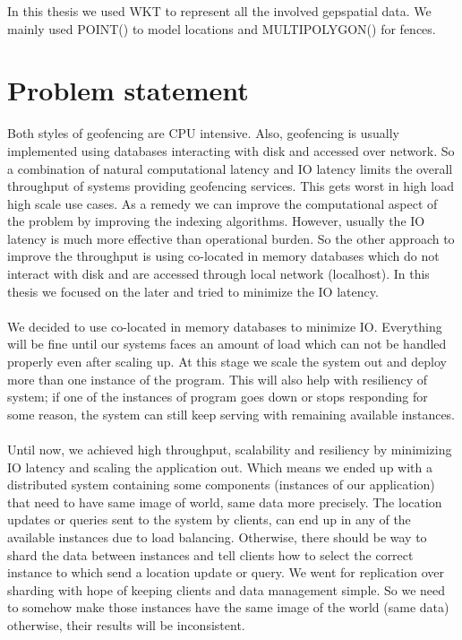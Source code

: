 \documentclass[a4]{report}
\begin{document}
        In this thesis we used WKT to represent all the involved gepspatial data.
        We mainly used POINT() to model locations and MULTIPOLYGON() for fences.

        \section{Problem statement}
        Both styles of geofencing are CPU intensive.
        Also, geofencing is usually implemented using databases interacting with disk and accessed over network.
        So a combination of natural computational latency and IO latency limits the overall throughput of systems
        providing geofencing services.
        This gets worst in high load high scale use cases.
        As a remedy we can improve the computational aspect of the problem by improving the indexing algorithms.
        However, usually the IO latency is much more effective than operational burden.
        So the other approach to improve the throughput is using co-located in memory databases  which do not interact
        with disk and are accessed through local network (localhost).
        In this thesis we focused on the later and tried to minimize the IO latency.

        \paragraph{}
        We decided to use co-located in memory databases to minimize IO.
        Everything will be fine until our systems faces an amount of load which can not be handled properly even after scaling up.
        At this stage we scale the system out and deploy more than one instance of the program.
        This will also help with resiliency of system;
        if one of the instances of program goes down or stops responding for some reason, the system can still keep
        serving with remaining available instances.

        \paragraph{}
        Until now, we achieved high throughput, scalability and resiliency by minimizing IO latency and scaling the
        application out.
        Which means we ended up with a distributed system containing some components (instances of our application) that
        need to have same image of world, same data more precisely.
        The location updates or queries sent to the system by clients, can end up in any of the available instances due
        to load balancing.
        Otherwise, there should be way to shard the data between instances and tell clients how to select the correct
        instance to which send a location update or query.
        We went for replication over sharding with hope of keeping clients and data management simple.
        So we need to somehow make those instances have the same image of the world (same data) otherwise, their results
        will be inconsistent.
\end{document}
